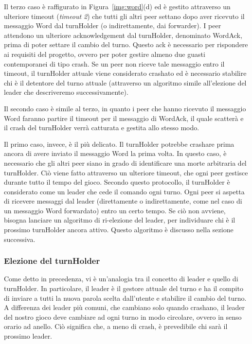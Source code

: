 \documentclass[9pt]{article}
\begin{document}
Il terzo caso è raffigurato in Figura~\ref{img:word}(d) ed è gestito attraverso un ulteriore timeout (\emph{timeout 2}) che tutti gli altri peer settano dopo aver ricevuto il messaggio Word dal turnHolder (o indirettamente, dai forwarder). I peer attendono un ulteriore acknowledgement dal turnHolder, denominato WordAck, prima di poter settare il cambio del turno. Questo ack è necessario per rispondere ai requisiti del progetto, ovvero per poter gestire almeno due guasti contemporanei di tipo crash. Se un peer non riceve tale messaggio entro il timeout, il turnHolder attuale viene considerato crashato ed è necessario stabilire chi è il detentore del turno attuale (attraverso un algoritmo simile all'elezione del leader che descriveremo successivamente).

Il secondo caso è simile al terzo, in quanto i peer che hanno ricevuto il messaggio Word faranno partire il timeout per il messaggio di WordAck, il quale scatterà e il crash del turnHolder verrà catturata e gestita allo stesso modo.

Il primo caso, invece, è il più delicato. Il turnHolder potrebbe crashare prima ancora di avere inviato il messaggio Word la prima volta. In questo caso, è necessario che gli altri peer siano in grado di identificare una morte arbitraria del turnHolder. Ciò viene fatto attraverso un ulteriore timeout, che ogni peer gestisce durante tutto il tempo del gioco. Secondo questo protocollo, il turnHolder è considerato come un leader che cede il comando ogni turno. Ogni peer si aspetta di ricevere messaggi dal leader (direttamente o indirettamente, come nel caso di un messaggio Word forwardato) entro un certo tempo. Se ciò non avviene, bisogna lanciare un algoritmo di ri-elezione del leader, per individuare chi è il prossimo turnHolder ancora attivo. Questo algoritmo è discusso nella sezione successiva.



\subsubsection*{Elezione del turnHolder}

Come detto in precedenza, vi è un'analogia tra il concetto di leader e quello di turnHolder. In particolare, il leader è il gestore attuale del turno e ha il compito di inviare a tutti la nuova parola scelta dall'utente e stabilire il cambio del turno. A differenza dei leader più comuni, che cambiano solo quando crashano, il leader del nostro gioco deve cambiare ad ogni turno in modo circolare, ovvero in senso orario ad anello. Ciò significa che, a meno di crash, è prevedibile chi sarà il prossimo leader.
\end{document}
